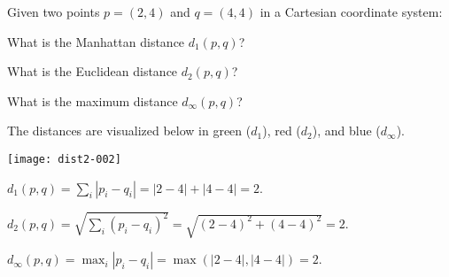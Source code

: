 
\begin{question}
Given two points $p = (2, 4)$ and
$q = (4, 4)$ in a Cartesian coordinate system:
\begin{answerlist}
  \item What is the Manhattan distance $d_1(p, q)$?
  \item What is the Euclidean distance $d_2(p, q)$?
  \item What is the maximum distance $d_\infty(p, q)$?
\end{answerlist}
\end{question}

\begin{solution}
The distances are visualized below in green ($d_1$), red ($d_2$),
and blue ($d_\infty$).

\texttt{[image: dist2-002]}

\begin{answerlist}
  \item $d_1(p, q) = \sum_i |p_i - q_i| = |2 - 4| +
    |4 - 4| = 2$.
  \item $d_2(p, q) = \sqrt{\sum_i (p_i - q_i)^2} = \sqrt{(2 -
    4)^2 + (4 - 4)^2} = 2$.
  \item $d_\infty(p, q) = \max_i |p_i - q_i| = \max(|2 -
    4|, |4 - 4|) = 2$.
\end{answerlist}
\end{solution}

